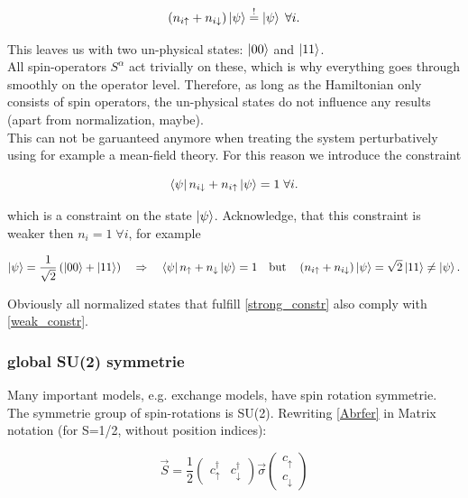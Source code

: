 \documentclass[../../../main.tex]{subfiles}
\begin{document}
\begin{equation}\label{strong_constr}
	\left(n_{i\uparrow} + n_{i\downarrow}\right)\ket{\psi} \overset{!}{=} \ket{\psi} \; \forall i.
\end{equation}

This leaves us with two un-physical states: $\ket{00}$ and $\ket{11}$. \\


All spin-operators $S^\alpha$ act trivially on these, which is why everything goes through smoothly on the operator level. Therefore, as long as the Hamiltonian only consists of spin operators, the un-physical states do not influence any results (apart from normalization, maybe). \\

This can not be garuanteed anymore when treating the system perturbatively using for example a mean-field theory. For this reason we introduce the constraint 

\begin{equation}\label{weak_constr}
\bra{\psi} n_{i\downarrow} + n_{i\uparrow}\ket{\psi} = 1 \; \forall i.
\end{equation}

which is a constraint on the state $\ket{\psi}$. Acknowledge, that this constraint is weaker then $n_i = 1 \; \forall i$, for example

\begin{equation}
	\ket{\psi} = \frac{1}{\sqrt{2}}\left(\ket{00} + \ket{11} \right) \quad \Rightarrow \quad \bra{\psi} n_{\uparrow} + n_{\downarrow} \ket{\psi} = 1\quad \text{but} \quad \left(n_{i\uparrow} + n_{i\downarrow}\right)\ket{\psi} = \sqrt{2}\ket{11} \not= \ket{\psi}.
\end{equation}

Obviously all normalized states that fulfill \ref{strong_constr} also comply with \ref{weak_constr}.

\subsubsection{global SU(2) symmetrie}

Many important models, e.g. exchange models, have spin rotation symmetrie. The symmetrie group of spin-rotations is SU(2). Rewriting \ref{Abrfer} in Matrix notation (for S=1/2, without position indices):

\begin{equation}
	\vec{S} = \frac12 
\begin{pmatrix}
c_\uparrow^\dagger & c_\downarrow^\dagger
\end{pmatrix}
\vec{\sigma}
\begin{pmatrix}
c_\uparrow \\
c_\downarrow
\end{pmatrix}
\end{equation}
\end{document}
